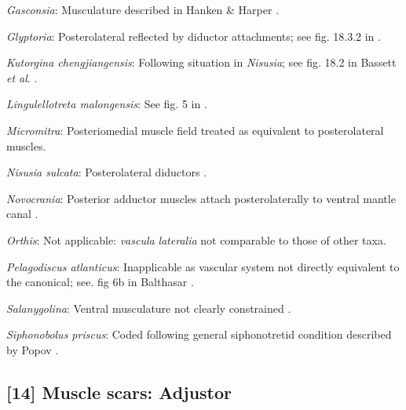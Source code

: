 \documentclass[openany]{book}
\theoremstyle{definition}
\theoremstyle{definition}
\theoremstyle{definition}
\theoremstyle{remark}
\begin{document}
\hypertarget{Gasconsia-coding-13}{}
\emph{Gasconsia}: Musculature described in Hanken \& Harper
\citeyearpar{Hanken1985Thetaxonomy}.

\hypertarget{Glyptoria-coding-13}{}
\emph{Glyptoria}: Posterolateral reflected by diductor attachments; see
fig. 18.3.2 in \citet{Bassett2001Functionalmorphology}.

\hypertarget{Kutorgina_chengjiangensis-coding-13}{}
\emph{Kutorgina chengjiangensis}: Following situation in \emph{Nisusia};
see fig. 18.2 in Bassett \emph{et al}.
\citeyearpar{Bassett2001Functionalmorphology}.

\hypertarget{Lingulellotreta_malongensis-coding-13}{}
\emph{Lingulellotreta malongensis}: See fig. 5 in
\citet{Holmer1997EarlyCambrian}.

\hypertarget{Micromitra-coding-13}{}
\emph{Micromitra}: Posteriomedial muscle field \citep[text-fig.
6]{Williams1998Thediversity} treated as equivalent to posterolateral
muscles.

\hypertarget{Nisusia_sulcata-coding-13}{}
\emph{Nisusia sulcata}: Posterolateral diductors \citep[fig. 18.2
in][]{Bassett2001Functionalmorphology}.

\hypertarget{Novocrania-coding-13}{}
\emph{Novocrania}: Posterior adductor muscles attach posterolaterally to
ventral mantle canal \citep{Robinson2014Themuscles}.

\hypertarget{Orthis-coding-13}{}
\emph{Orthis}: Not applicable: \emph{vascula} \emph{lateralia} not
comparable to those of other taxa.

\hypertarget{Pelagodiscus_atlanticus-coding-13}{}
\emph{Pelagodiscus atlanticus}: Inapplicable as vascular system not
directly equivalent to the canonical; see. fig 6b in Balthasar
\citeyearpar{Balthasar2009Thebrachiopod}.

\hypertarget{Salanygolina-coding-13}{}
\emph{Salanygolina}: Ventral musculature not clearly constrained
\citep{Holmer2009Theenigmatic}.

\hypertarget{Siphonobolus_priscus-coding-13}{}
\emph{Siphonobolus priscus}: Coded following general siphonotretid
condition described by Popov \citeyearpar[p.~407]{Popov1992TheCambrian}.

\subsection*{{[}14{]} Muscle scars:
Adjustor}\label{muscle-scars-adjustor}
\end{document}
